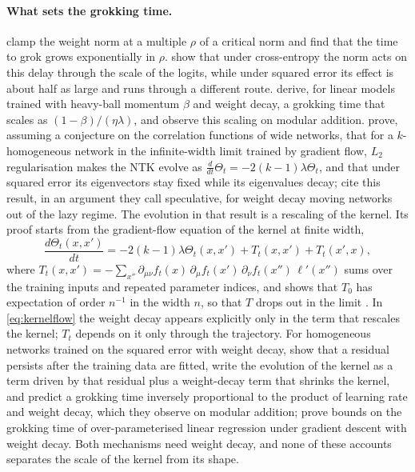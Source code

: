 \documentclass[a4paper,11pt]{article} %
\begin{document}
\paragraph{What sets the grokking time.}  clamp
the weight norm at a multiple $\rho$ of a critical norm and find that the time
to grok grows exponentially in $\rho$.  show that
under cross-entropy the norm acts on this delay through the scale of the logits,
while under squared error its effect is about half as large and runs through a
different route.  derive, for linear
models trained with heavy-ball momentum $\beta$ and weight decay, a
grokking time
that scales as $(1-\beta)/(\eta\lambda)$, and observe this scaling on modular
addition.  prove, assuming a
conjecture on the
correlation functions of wide networks, that for a $k$-homogeneous network in
the infinite-width limit trained by gradient flow, $L_2$ regularisation makes
the NTK evolve as $\frac{d}{dt}\Theta_t=-2(k-1)\lambda\Theta_t$, and that under
squared error its eigenvectors stay fixed while its eigenvalues decay;
\citet{kumarGrokkingTransitionLazy2024} cite this result, in an argument they
call speculative, for weight decay moving networks out of the lazy regime.
The evolution in that result is a rescaling of the kernel. Its proof starts
from the gradient-flow equation of the kernel at finite width,
\begin{equation}
  \frac{d\Theta_t(x,x')}{dt} = -2(k-1)\lambda\Theta_t(x,x')
  + T_t(x,x') + T_t(x',x),
  \label{eq:kernelflow}
\end{equation}
where $T_t(x,x')=-\sum_{x''}\partial_{\mu\nu}f_t(x)\,\partial_\mu f_t(x')\,
\partial_\nu f_t(x'')\,\ell'(x'')$ sums over the training inputs and
repeated parameter indices, and shows that $T_0$ has expectation of order
$n^{-1}$ in the width $n$, so that $T$ drops out in the limit
\citep{lewkowyczTrainingDynamicsDeep2021}. In \eqref{eq:kernelflow} the
weight decay appears explicitly only in the term that rescales the kernel;
$T_t$ depends on it only through the trajectory. For homogeneous
networks trained on the squared error with weight decay,
\citet{pracherSpectralTheoryGrokking2026} show that a residual persists
after the training data are fitted, write the
evolution of the kernel as a term driven by that residual plus a weight-decay
term that shrinks the kernel, and predict a grokking time inversely
proportional to the product of learning rate and weight decay, which they
observe on modular addition; \citet{xuGrokGrokkingProvable2026} prove
bounds on the grokking time of over-parameterised linear regression under
gradient descent with weight decay. Both mechanisms need weight decay, and none
of these accounts separates the scale of the kernel from its shape.
\end{document}
